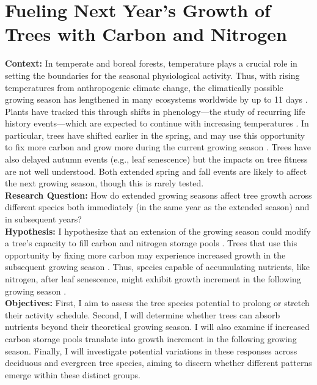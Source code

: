 \documentclass{article}
\begin{document}
\section*{Fueling Next Year's Growth of Trees with Carbon and Nitrogen}
\textbf {Context:}
In temperate and boreal forests, temperature plays a crucial role in setting the boundaries for the seasonal physiological activity. Thus, with rising temperatures from anthropogenic climate change, the climatically possible growing season has lengthened in many ecosystems worldwide by up to 11 days \citep{korner_phenology_2010, menzel_growing_1999}. Plants have tracked this through shifts in phenology—the study of recurring life history events—which are expected to continue with increasing temperatures \citep{wolkovich_warming_2012}. In particular, trees have shifted earlier in the spring, and may use this opportunity to fix more carbon and grow more during the current growing season \citep{keenan_net_2014, wang_interactive_2020}. Trees have also delayed autumn events (e.g., leaf senescence) but the impacts on tree fitness are not well understood. Both extended spring and fall events are likely to affect the next growing season, though this is rarely tested. \\
\textbf {Research Question:} How do extended growing seasons affect tree growth across different species both immediately (in the same year as the extended season) and in subsequent years? \\
\textbf {Hypothesis:} I hypothesize that an extension of the growing season could modify a tree’s capacity to fill carbon and nitrogen storage pools \citep{chapin_ecology_nodate, lawrence_variable_2018}. Trees that use this opportunity by fixing more carbon may experience increased growth in the subsequent growing season \citep{landhausser_partitioning_2012, martens_first-year_2007}. Thus, species capable of accumulating nutrients, like nitrogen, after leaf senescence, might exhibit growth increment in the following growing season \citep{schott_premature_2013}. \\
\textbf {Objectives:} First, I aim to assess the tree species potential to prolong or stretch their activity schedule. Second, I will determine whether trees can absorb nutrients beyond their theoretical growing season. I will also examine if increased carbon storage pools translate into growth increment in the following growing season. Finally, I will investigate potential variations in these responses across deciduous and evergreen tree species, aiming to discern whether different patterns emerge within these distinct groups.\\
\end{document}

